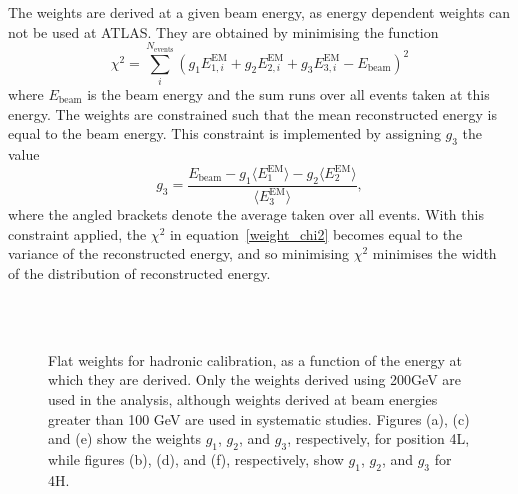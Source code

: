 The weights are derived at a given beam energy, as energy dependent weights can not be used at ATLAS. They are obtained by minimising the function
\begin{equation}
\chi^2 = \sum_i^{N_\mathrm{events}}\left( g_1 E_{1,i}^\mathrm{EM} +  g_2 E_{2,i}^\mathrm{EM} +  g_3 E_{3,i}^\mathrm{EM} - E_\mathrm{beam} \right )^2
\label{weight_chi2}
\end{equation}
where $E_\mathrm{beam}$ is the beam energy and the sum  runs over all events taken at this energy. The weights are constrained such that the mean reconstructed energy is equal to the beam energy. This constraint is implemented by assigning $g_3$ the value
\begin{equation}
\label{hadronic_weight_constraint}
g_3 = \frac{ E_\mathrm{beam}  - g_1 \langle E_{1}^\mathrm{EM}\rangle - g_2 \langle E_{2}^\mathrm{EM}\rangle }{\langle E_{3}^\mathrm{EM}\rangle},
\end{equation}
where the angled brackets denote the average taken over all events. With this constraint applied, the $\chi^2$ in equation~\ref{weight_chi2} becomes equal to the variance of the reconstructed energy, and so minimising $\chi^2$ minimises the width of the distribution of reconstructed energy.


\begin{figure}
\begin{center}
\\
\\
\caption[Flat weights for hadronic calibration]{Flat weights for hadronic calibration, as a function of the energy at which they are derived. Only the weights derived using 200GeV are used in the analysis, although weights derived at beam energies greater than 100 GeV are used in systematic studies. Figures (a), (c) and (e) show the weights $g_1$, $g_2$, and $g_3$, respectively, for position 4L, while figures (b), (d), and (f), respectively, show  $g_1$, $g_2$, and $g_3$ for 4H.}
\label{TBplot_c16_weights}
\end{center}
\end{figure}


